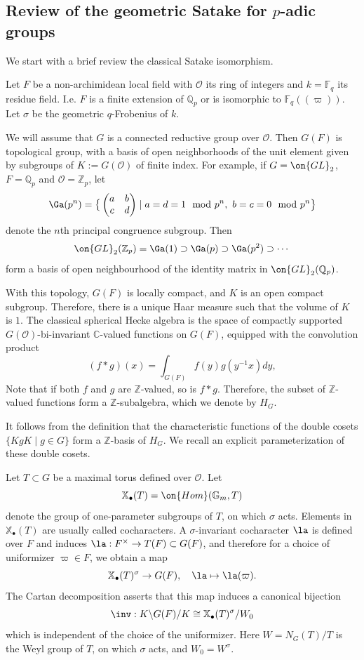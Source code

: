\documentclass[11pt]{amsart}
\theoremstyle{definition}
\theoremstyle{definition}
\theoremstyle{definition}
\numberwithin{equation}{subsection}
\newcommand{\bC}{{\mathbb C}}
\newcommand{\bF}{{\mathbb F}}
\newcommand{\bG}{{\mathbb G}}
\newcommand{\bQ}{{\mathbb Q}}
\newcommand{\bZ}{{\mathbb Z}}
\newcommand{\mO}{{\mathcal O}}
\newcommand{\Hom}{{\on{Hom}}}
\newcommand{\GL}{{\on{GL}}}
\def\xcoch{\mathbb{X}_\bullet}
\begin{document}
\subsection{Review of the geometric Satake for $p$-adic groups}
\label{S: affGrass}
We start with a brief review the classical Satake isomorphism. 

Let $F$ be a non-archimidean local field with $\mO$ its ring of integers and $k=\bF_q$ its residue field. I.e. $F$ is a finite extension of $\bQ_p$ or is isomorphic to $\bF_q((\varpi))$.
Let $\sigma$ be the geometric $q$-Frobenius of $k$.

We will assume that $G$ is a connected reductive group over $\mO$. 
Then $G(F)$ is topological group, with a basis of open neighborhoods of the unit element given by subgroups of $K:=G(\mO)$ of finite index. 
For example, if $G=\GL_2$, $F=\bQ_p$ and $\mO=\bZ_p$, let 
$$\Ga(p^n)=\big\{\begin{pmatrix}a& b\\ c& d\end{pmatrix}\mid a=d=1 \mod p^n,\  b=c=0 \mod p^n\big\}$$ 
denote the $n$th principal congruence subgroup. Then 
$$\GL_2(\bZ_p)=\Ga(1)\supset\Ga(p)\supset\Ga(p^2)\supset\cdots$$ form a basis of open neighbourhood of the identity matrix in $\GL_2(\bQ_p)$.

With this topology, $G(F)$ is locally compact, and $K$ is an open compact subgroup. Therefore, there is a unique Haar measure such that the volume of $K$ is $1$.
The classical spherical Hecke algebra is the space of compactly supported $G(\mO)$-bi-invariant $\bC$-valued functions on $G(F)$, equipped with the convolution product
\begin{equation}
\label{E:conv prod alge}
(f*g)(x)=\int_{G(F)}f(y)g(y^{-1}x)dy,
\end{equation}
Note that if both $f$ and $g$ are $\bZ$-valued, so is $f*g$. Therefore, the subset of $\bZ$-valued functions form a $\bZ$-subalgebra, which we denote by $H_G$.

It follows from the definition that the characteristic functions of the double cosets $\{KgK\mid g\in G\}$ form a $\bZ$-basis of $H_G$. We recall an explicit parameterization of these double cosets.


Let $T\subset G$ be a maximal torus defined over $\mO$. Let 
$$\xcoch(T)=\Hom(\bG_m,T)$$ denote the group of one-parameter subgroups of $T$, on which $\sigma$ acts.
Elements in $\xcoch(T)$ are usually called cocharacters. A $\sigma$-invariant cocharacter $\la$ is defined over $F$ and induces $\la: F^\times\to T(F)\subset G(F)$, and therefore for a choice of uniformizer $\varpi\in F$, we obtain a map
\begin{equation*}\label{cartan1}
\xcoch(T)^\sigma\to G(F), \quad \la\mapsto \la(\varpi).
\end{equation*}
The Cartan decomposition asserts that this map induces a canonical bijection
\begin{equation}\label{cartan2}
\inv:  K\backslash G(F)/K\cong \xcoch(T)^{\sigma}/W_0 
\end{equation}
which is independent of the choice of the uniformizer. Here $W=N_G(T)/T$ is the Weyl group of $T$, on which $\sigma$ acts, and $W_0=W^{\sigma}$.
\end{document}
